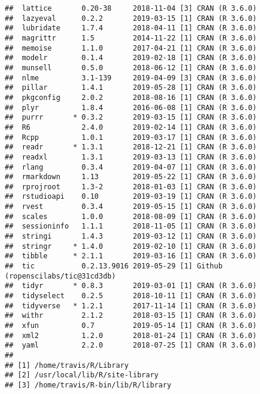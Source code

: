 \documentclass[]{book}
\begin{document}
\begin{verbatim}
##  lattice       0.20-38     2018-11-04 [3] CRAN (R 3.6.0)                   
##  lazyeval      0.2.2       2019-03-15 [1] CRAN (R 3.6.0)                   
##  lubridate     1.7.4       2018-04-11 [1] CRAN (R 3.6.0)                   
##  magrittr      1.5         2014-11-22 [1] CRAN (R 3.6.0)                   
##  memoise       1.1.0       2017-04-21 [1] CRAN (R 3.6.0)                   
##  modelr        0.1.4       2019-02-18 [1] CRAN (R 3.6.0)                   
##  munsell       0.5.0       2018-06-12 [1] CRAN (R 3.6.0)                   
##  nlme          3.1-139     2019-04-09 [3] CRAN (R 3.6.0)                   
##  pillar        1.4.1       2019-05-28 [1] CRAN (R 3.6.0)                   
##  pkgconfig     2.0.2       2018-08-16 [1] CRAN (R 3.6.0)                   
##  plyr          1.8.4       2016-06-08 [1] CRAN (R 3.6.0)                   
##  purrr       * 0.3.2       2019-03-15 [1] CRAN (R 3.6.0)                   
##  R6            2.4.0       2019-02-14 [1] CRAN (R 3.6.0)                   
##  Rcpp          1.0.1       2019-03-17 [1] CRAN (R 3.6.0)                   
##  readr       * 1.3.1       2018-12-21 [1] CRAN (R 3.6.0)                   
##  readxl        1.3.1       2019-03-13 [1] CRAN (R 3.6.0)                   
##  rlang         0.3.4       2019-04-07 [1] CRAN (R 3.6.0)                   
##  rmarkdown     1.13        2019-05-22 [1] CRAN (R 3.6.0)                   
##  rprojroot     1.3-2       2018-01-03 [1] CRAN (R 3.6.0)                   
##  rstudioapi    0.10        2019-03-19 [1] CRAN (R 3.6.0)                   
##  rvest         0.3.4       2019-05-15 [1] CRAN (R 3.6.0)                   
##  scales        1.0.0       2018-08-09 [1] CRAN (R 3.6.0)                   
##  sessioninfo   1.1.1       2018-11-05 [1] CRAN (R 3.6.0)                   
##  stringi       1.4.3       2019-03-12 [1] CRAN (R 3.6.0)                   
##  stringr     * 1.4.0       2019-02-10 [1] CRAN (R 3.6.0)                   
##  tibble      * 2.1.1       2019-03-16 [1] CRAN (R 3.6.0)                   
##  tic           0.2.13.9016 2019-05-29 [1] Github (ropenscilabs/tic@31cd3db)
##  tidyr       * 0.8.3       2019-03-01 [1] CRAN (R 3.6.0)                   
##  tidyselect    0.2.5       2018-10-11 [1] CRAN (R 3.6.0)                   
##  tidyverse   * 1.2.1       2017-11-14 [1] CRAN (R 3.6.0)                   
##  withr         2.1.2       2018-03-15 [1] CRAN (R 3.6.0)                   
##  xfun          0.7         2019-05-14 [1] CRAN (R 3.6.0)                   
##  xml2          1.2.0       2018-01-24 [1] CRAN (R 3.6.0)                   
##  yaml          2.2.0       2018-07-25 [1] CRAN (R 3.6.0)                   
## 
## [1] /home/travis/R/Library
## [2] /usr/local/lib/R/site-library
## [3] /home/travis/R-bin/lib/R/library
\end{verbatim}
\end{document}
